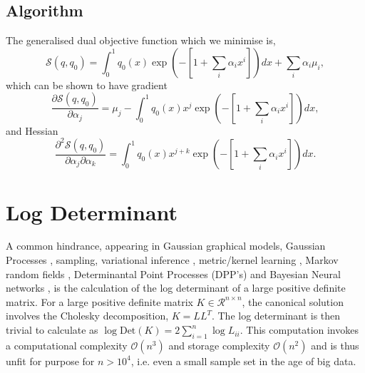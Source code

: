 \documentclass[letterpaper]{article} %
\begin{document}
\subsection{Algorithm}
\label{algorithm}
The generalised dual objective function which we minimise is,
\begin{equation}
\mathcal{S}(q,q_{0}) = \int_{0}^{1}q_{0}(x)\exp(-[1+\sum_{i}\alpha_{i}x^{i}])dx+ \sum_{i}\alpha_{i}\mu_{i},
\end{equation}
which can be shown to have gradient
\begin{equation}
\frac{\partial \mathcal{S}(q,q_{0})}{\partial \alpha_{j}}= \mu_{j}-\int_{0}^{1}q_{0}(x)x^{j}\exp(-[1+\sum_{i}\alpha_{i}x^{i}])dx,
\end{equation}
and Hessian
\begin{equation}
\frac{\partial^{2} \mathcal{S}(q,q_{0})}{\partial \alpha_{j}\partial\alpha_{k}}= \int_{0}^{1}q_{0}(x)x^{j+k}\exp(-[1+\sum_{i}\alpha_{i}x^{i}])dx.
\end{equation}
\section{Log Determinant}
A common hindrance, appearing in Gaussian graphical models, Gaussian Processes \cite{rue2005gaussian,rasmussen2006gaussian}, sampling, variational inference \cite{mackay2003information}, metric/kernel learning \cite{davis2007information,van2009minimum}, Markov random fields \cite{wainwright2006log}, Determinantal Point Processes (DPP's) and Bayesian Neural networks \cite{mackay1992bayesian}, is the calculation of the log determinant of a large positive definite matrix. For a large positive definite matrix $K \in  \mathcal{R}^{n\times n}$, the canonical solution involves the Cholesky decomposition, $K = LL^{T}$. The log determinant is then trivial to calculate as $\log \mathrm{Det}(K) = 2\sum_{i=1}^{n}\log L_{ii}$. This computation invokes a computational complexity $\mathcal{O}(n^{3})$ and storage complexity $\mathcal{O}(n^{2})$ and is thus unfit for purpose for $n>10^{4}$, i.e. even a small sample set in the age of big data. 
\end{document}
